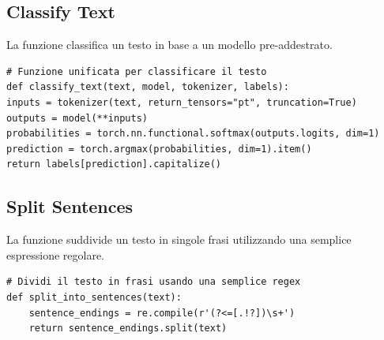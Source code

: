 \documentclass{article}
\begin{document}
		\subsection{Classify Text}
La funzione classifica un testo in base a un modello pre-addestrato.
	\begin{lstlisting}
# Funzione unificata per classificare il testo
def classify_text(text, model, tokenizer, labels):
inputs = tokenizer(text, return_tensors="pt", truncation=True)
outputs = model(**inputs)
probabilities = torch.nn.functional.softmax(outputs.logits, dim=1)
prediction = torch.argmax(probabilities, dim=1).item()
return labels[prediction].capitalize()	
	\end{lstlisting}
	
		\subsection{Split Sentences}
	La funzione suddivide un testo in singole frasi utilizzando una semplice espressione regolare.
	\begin{lstlisting}
# Dividi il testo in frasi usando una semplice regex
def split_into_sentences(text):
	sentence_endings = re.compile(r'(?<=[.!?])\s+')
	return sentence_endings.split(text)
	\end{lstlisting}
\end{document}
